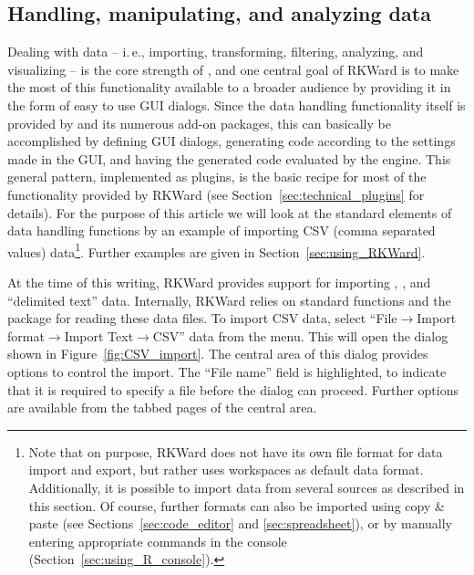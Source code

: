 \subsection{Handling, manipulating, and analyzing data}
\label{sec:analyzing_data}

Dealing with data -- i.\,e., importing, transforming, filtering, analyzing, and visualizing  --
is the core strength of , and one central goal of
RKWard is to make the most of this functionality available to a broader
audience by providing it in the form of easy to use GUI dialogs. Since
the data handling functionality itself is provided by
 and its numerous add-on packages, this
can basically be accomplished by defining GUI dialogs, generating
 code according to the settings made in
the GUI, and having the generated code evaluated by the
 engine. 
This general pattern, implemented as plugins, is the
basic recipe for most of the functionality provided by RKWard
(see Section~\ref{sec:technical_plugins} for details). For
the purpose of this article we will look at the standard
elements of data handling functions by an example of importing CSV
(comma separated values) data\footnote {
  Note that on purpose, RKWard does not have its
  own file format for data import and export, but rather uses
   workspaces as default data format. Additionally, it is possible
  to import data from several sources as described in this section. Of course, further formats can
  also be imported using copy \& paste (see Sections~\ref{sec:code_editor} and \ref{sec:spreadsheet}), or by
  manually entering appropriate  commands in
  the  console (Section~\ref{sec:using_R_console}).
}. Further examples are given in Section~\ref{sec:using_RKWard}.

At the time of this writing, RKWard provides support for importing ,
, and ``delimited text'' data. Internally, RKWard
relies on standard  functions and the package 
\citep{Murdoch2002} for reading these data files. To import CSV data,
select ``File$\rightarrow$Import format$\rightarrow$Import Text$\rightarrow$CSV''
data from the menu. This will open the dialog shown in
Figure~\ref{fig:CSV_import}. The central area of this dialog provides 
options to control the import. The 
``File name'' field is highlighted, to indicate that
it is required to specify a file before the dialog can proceed.
Further options are available from the tabbed pages of the central area.

